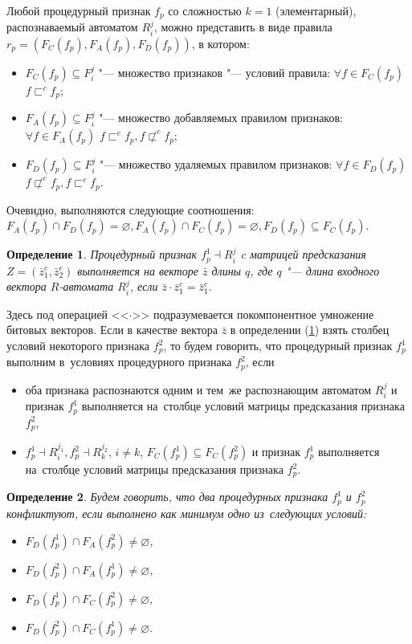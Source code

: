 \documentclass[a4paper, 12pt]{article}
\theoremstyle{plain}
\newtheorem{Def}{Определение}
\begin{document}
	Любой процедурный признак $f_p$ со сложностью $k=1$ (элементарный), распознаваемый автоматом $R_i^j$, можно представить в виде правила $r_p=(F_C(f_p),F_A(f_p),F_D(f_p))$, в котором:
	\begin{itemize}
		\item $F_C (f_p )\subseteq F_i^j$ "--- множество признаков "--- условий правила: $\forall f\in F_C(f_p)$ $f\sqsubset^c f_p$;
		\item $F_A(f_p)\subseteq F_i^j$ "--- множество добавляемых правилом признаков: $\forall f\in F_A(f_p)$ $f\sqsubset^e f_p,f\not\sqsubset^c f_p$;
		\item $F_D(f_p)\subseteq F_i^j$ "--- множество удаляемых правилом признаков: $\forall f\in F_D(f_p)$ $f\not\sqsubset^e f_p,f\sqsubset^c f_p$.
	\end{itemize}
	
	Очевидно, выполняются следующие соотношения: $F_A(f_p)\cap F_D(f_p)=\varnothing, F_A(f_p)\cap F_C(f_p)=\varnothing, F_D(f_p)\subseteq F_C(f_p)$.

	\begin{Def}\label{def:feas}
		Процедурный признак $f_p^1\dashv R_i^j$ c матрицей предсказания $Z=(\bar z_1^c,\bar z_2^e)$ выполняется на векторе $\bar z$ длины $q$, где $q$ "--- длина входного вектора $R$-автомата $R_i^j$, если $\bar z\cdot \bar z_1^c=\bar z_1^c$.
	\end{Def}
	
	Здесь под операцией <<$\cdot$>> подразумевается покомпонентное умножение битовых векторов. Если в качестве вектора $\bar z$ в определении (\ref{def:feas}) взять столбец условий некоторого признака $f_p^2$, то будем говорить, что процедурный признак $f_p^1$ выполним в~условиях процедурного признака $f_p^2$, если 
	\begin{itemize}
		\item оба признака распознаются одним и тем~же распознающим автоматом $R_i^j$ и признак  $f_p^1$ выполняется на~столбце условий матрицы предсказания признака $f_p^2$,
		\item $f_p^1\dashv R_i^{j_1}, f_p^2\dashv R_k^{j_2}$, $i\not=k$, $F_C(f_p^1 )\subseteq F_C(f_p^2)$ и признак  $f_p^1$ выполняется на~столбце условий матрицы предсказания признака $f_p^2$. 
	\end{itemize}
	
	\begin{Def}
		Будем говорить, что два процедурных признака $f_p^1$ и $f_p^2$ конфликтуют, если выполнено как минимум одно из~следующих условий:
		\begin{itemize}
			\item $F_D(f_p^1)\cap F_A(f_p^2)\not=\varnothing$,
			\item $F_D(f_p^2)\cap F_A(f_p^1)\not=\varnothing$,
			\item $F_D(f_p^1)\cap F_C(f_p^2)\not=\varnothing$,
			\item $F_D(f_p^2)\cap F_C(f_p^1)\not=\varnothing$.
		\end{itemize}
	\end{Def}
	
\end{document}

